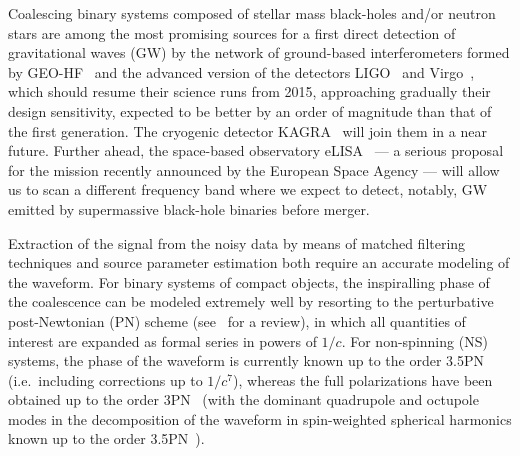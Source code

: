 \documentclass[
superscriptaddress,
preprint,
prd,tightenlines,showpacs,nofootinbib,
eqsecnum,
amsfonts,amsmath,amssymb]{revtex4-1}
\begin{document}
Coalescing binary systems composed of stellar mass black-holes and/or neutron
stars are among the most promising sources for a first direct detection of
gravitational waves (GW) by the network of ground-based interferometers formed
by GEO-HF~\cite{geo} and the advanced version of the detectors
LIGO~\cite{ligo} and Virgo~\cite{virgo}, which should resume their science
runs from 2015, approaching gradually their design sensitivity, expected to be
better by an order of magnitude than that of the first generation. The
cryogenic detector KAGRA~\cite{kagra} will join them in a near future. Further
ahead, the space-based observatory eLISA~\cite{Whitepaper, NGOScience} --- a
serious proposal for the mission recently announced by the European Space
Agency --- will allow us to scan a different frequency band where we expect to
detect, notably, GW emitted by supermassive black-hole binaries before merger.

Extraction of the signal from the noisy data by means of matched filtering
techniques and source parameter estimation both require an accurate modeling
of the waveform. For binary systems of compact objects, the inspiralling phase
of the coalescence can be modeled extremely well by resorting to the
perturbative post-Newtonian (PN) scheme (see~\cite{Bliving} for a review), in
which all quantities of interest are expanded as formal series in powers of
$1/c$. For non-spinning (NS) systems, the phase of the waveform is currently
known up to the order 3.5PN (i.e.\ including corrections up to $1/c^7$),
whereas the full polarizations have been obtained up to the order
3PN~\cite{BFIS08} (with the dominant quadrupole and octupole modes in the
decomposition of the waveform in spin-weighted spherical harmonics known up to
the order 3.5PN~\cite{FMBI12,FBI14}).
\end{document}
